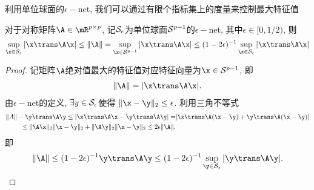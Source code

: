 利用单位球面的$\epsilon-$net, 我们可以通过有限个指标集上的度量来控制最大特征值
\begin{prop} \label{net-prop}
    对于对称矩阵$\A \in \mR^{p \times p}$, 记$\mathcal{S}_\epsilon$为单位球面$\mathcal{S}^{p-1}$的$\epsilon-$net, 其中$\epsilon \in [0,1/2)$, 则
    \begin{align*}
        \sup_{\x \in \mS_\epsilon} |\x \trans \A \x| \leq   \|\A\|=\sup_{\x \in \mS^{p-1}} |\x \trans \A \x| \leq (1-2\epsilon)^{-1}  \sup_{\x \in \mS_\epsilon} |\x \trans \A \x|
    \end{align*}
\end{prop}
\begin{proof}
    记矩阵$\A$绝对值最大的特征值对应特征向量为$\x \in \mS^{p-1}$, 即
    \begin{align*}
        \|\A\|=|\x \trans \A \x|.
    \end{align*}
由$\epsilon-$net的定义, $\exists y \in \mathcal{S}_{\epsilon}$使得 $\|\x-\y\|_2\leq \epsilon$. 利用三角不等式
\begin{align*}
   \|A\|- \y \trans \A \y \leq |\x \trans \A \x-\y \trans \A \y|=&|\x \trans \A (\x-\y)+\y \trans \A (\x-\y)|\\
    \leq \|\A \x\|_2 \|\x-\y\|_2+\|\A \y\|_2 \|\x-\y\|_2 \leq 2 \epsilon \|\A\|,
\end{align*} 
即
\begin{align*}
\|\A\|\leq (1-2\epsilon)^{-1} \y \trans \A \y \leq (1-2\epsilon)^{-1}  \sup_{\y \in \mS_\epsilon} |\y \trans \A \y|.
\end{align*}
\end{proof}

